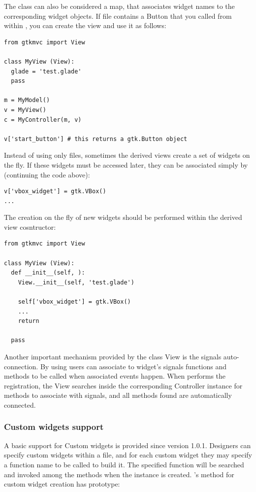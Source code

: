 The  class can also be considered a map, that
associates widget names to the corresponding widget objects. If file
 contains a Button that you called
 from within \glade, you can create the view
and use it as follows:

{ \codesize 
\begin{verbatim}
from gtkmvc import View

class MyView (View):
  glade = 'test.glade'
  pass 

m = MyModel()
v = MyView()
c = MyController(m, v)

v['start_button'] # this returns a gtk.Button object
\end{verbatim}
}

Instead of using only \glade files, sometimes the derived views create
a set of widgets on the fly. If these widgets must be accessed later,
they can be associated simply by (continuing the code above):

{ \codesize 
\begin{verbatim}
v['vbox_widget'] = gtk.VBox()
...
\end{verbatim}
}

The creation on the fly of new widgets should be performed within
the derived view cosntructor:

{ \codesize 
\begin{verbatim}
from gtkmvc import View

class MyView (View):
  def __init__(self, ):
    View.__init__(self, 'test.glade')

    self['vbox_widget'] = gtk.VBox()
    ...
    return

  pass 
\end{verbatim}
}


Another important mechanism provided by the class View is the signals
auto-connection. By using \glade users can associate to widget's
signals functions and methods to be called when associated events
happen.  When performs the registration, the View searches inside the
corresponding Controller instance for methods to associate with
signals, and all methods found are automatically connected.


\subsubsection{Custom widgets support}
A basic support for Custom widgets is provided since version 1.0.1.
Designers can specify custom widgets within a \glade file, and for
each custom widget they may specify a function name to be called to
build it. The specified function will be searched and invoked among
the  methods when the instance is
created. 's method for custom widget creation
has prototype:

